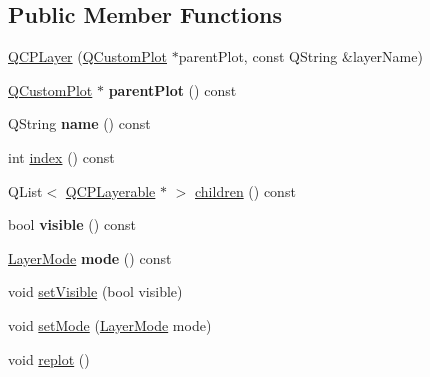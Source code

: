 \subsection*{Public Member Functions}
\begin{DoxyCompactItemize}
\item 
\mbox{\hyperlink{class_q_c_p_layer_a5d0657fc86d624e5efbe930ef21af718}{Q\+C\+P\+Layer}} (\mbox{\hyperlink{class_q_custom_plot}{Q\+Custom\+Plot}} $\ast$parent\+Plot, const Q\+String \&layer\+Name)
\item 
\mbox{\label{class_q_c_p_layer_a5520019787482e13857ebe631c27c3fa}} 
\mbox{\hyperlink{class_q_custom_plot}{Q\+Custom\+Plot}} $\ast$ {\bfseries parent\+Plot} () const
\item 
\mbox{\label{class_q_c_p_layer_a37806f662b50b588fb1029a14fc5ef50}} 
Q\+String {\bfseries name} () const
\item 
int \mbox{\hyperlink{class_q_c_p_layer_ad322905c4700dcc7ceba63e011c730d2}{index}} () const
\item 
Q\+List$<$ \mbox{\hyperlink{class_q_c_p_layerable}{Q\+C\+P\+Layerable}} $\ast$ $>$ \mbox{\hyperlink{class_q_c_p_layer_a183b90941fc78f0b136edd77c5fb6966}{children}} () const
\item 
\mbox{\label{class_q_c_p_layer_ad1cc2d6b32d2abb33c7f449b964e068c}} 
bool {\bfseries visible} () const
\item 
\mbox{\label{class_q_c_p_layer_a44ae50b011b19f3dd46a38d8e2e2c1b6}} 
\mbox{\hyperlink{class_q_c_p_layer_a67dcfc1590be2a1f2227c5a39bb59c7c}{Layer\+Mode}} {\bfseries mode} () const
\item 
void \mbox{\hyperlink{class_q_c_p_layer_ac07671f74edf6884b51a82afb2c19516}{set\+Visible}} (bool visible)
\item 
void \mbox{\hyperlink{class_q_c_p_layer_a938d57b04f4e4c23cedf1711f983919b}{set\+Mode}} (\mbox{\hyperlink{class_q_c_p_layer_a67dcfc1590be2a1f2227c5a39bb59c7c}{Layer\+Mode}} mode)
\item 
void \mbox{\hyperlink{class_q_c_p_layer_adefd53b6db02f470151c416f42e37180}{replot}} ()
\end{DoxyCompactItemize}
